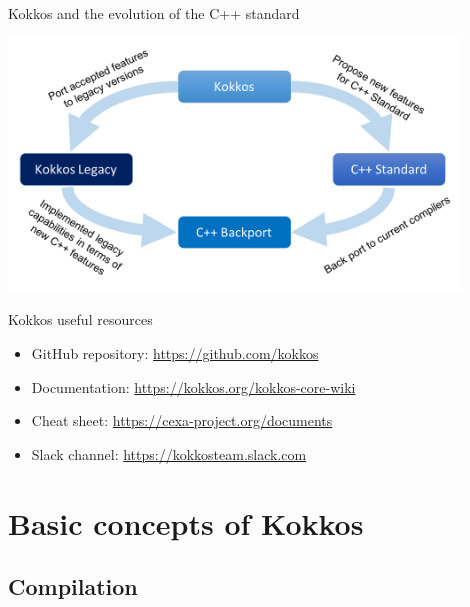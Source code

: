 \documentclass[aspectratio=169]{beamer}
\begin{document}

\begin{frame}{Kokkos and the evolution of the C++ standard}
    \begin{center}
        \includegraphics[width=0.9\textwidth]{kokkos-cpp-standard.png}
    \end{center}
\end{frame}


\begin{frame}{Kokkos useful resources}
    \begin{itemize}
        \item GitHub repository: \url{https://github.com/kokkos}
        \item Documentation: \url{https://kokkos.org/kokkos-core-wiki}
        \item Cheat sheet: \url{https://cexa-project.org/documents}
        \item Slack channel: \url{https://kokkosteam.slack.com}
    \end{itemize}
\end{frame}


\section{Basic concepts of Kokkos}


\subsection{Compilation}
\end{document}
